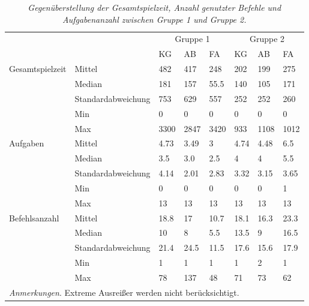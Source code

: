\begin{table}[htbp]
\centering
\caption{\textit{Gegenüberstellung der Gesamtspielzeit, Anzahl genutzter Befehle und Aufgabenanzahl zwischen Gruppe 1 und Gruppe 2.}}
\begin{tabular}{ p{2.5cm}  p{3.5cm}  p{0.85cm} p{0.85cm}  p{0.85cm}  p{0.85cm} p{0.85cm} p{0.85cm}}
 \hline
 & & \multicolumn{3}{c}{Gruppe 1} & \multicolumn{3}{c}{Gruppe 2}\\
 & & KG & AB & FA & KG & AB & FA\\
 \hline
  Gesamtspielzeit   & Mittel                    & 482   & 417   & 248   & 202  & 199  & 275   \\
                    & Median                    & 181   & 157   & 55.5  & 140  & 105  & 171   \\
                    & Standardabweichung        & 753   & 629   & 557   & 252  & 252  & 260   \\
                    & Min                       & 0     & 0     & 0     & 0    & 0    & 0     \\
                    & Max                       & 3300  & 2847  & 3420  & 933  & 1108 & 1012  \\
 \hline
  Aufgaben          & Mittel                    & 4.73  & 3.49  & 3     & 4.74 & 4.48   & 6.5     \\
                    & Median                    & 3.5   & 3.0   & 2.5   & 4    & 4      & 5.5     \\
                    & Standardabweichung        & 4.14  & 2.01  & 2.83  & 3.32 & 3.15   & 3.65     \\
                    & Min                       & 0     & 0     & 0     & 0    & 0      & 1     \\
                    & Max                       & 13    & 13    & 13    & 13   & 13     & 13     \\
  \hline
  Befehlsanzahl     & Mittel                    & 18.8 & 17    & 10.7  & 18.1   & 16.3   & 23.3     \\
                    & Median                    & 10   & 8     & 5.5   & 13.5   & 9      & 16.5     \\
                    & Standardabweichung        & 21.4 & 24.5  & 11.5  & 17.6   & 15.6   & 17.9     \\
                    & Min                       & 1    & 1     & 1     & 1      & 2      & 1     \\
                    & Max                       & 78   & 137   & 48    & 71     & 73     & 62     \\

  
 \hline
 \multicolumn{8}{l}{%
 \small%
\textit{Anmerkungen}. Extreme Ausreißer werden nicht berücksichtigt.
}\\
\end{tabular}
\label{final}
\end{table}


